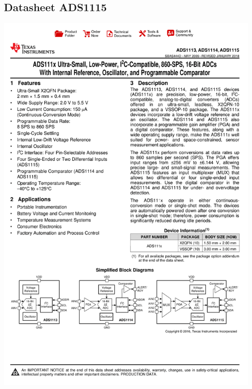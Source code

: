 
\begin{anexosenv}
	
	\partanexos
	
	\chapter{Datasheet ADS1115}
%
	\includegraphics[scale=0.35]{Anexos/ads1115.png}
	

\end{anexosenv}
